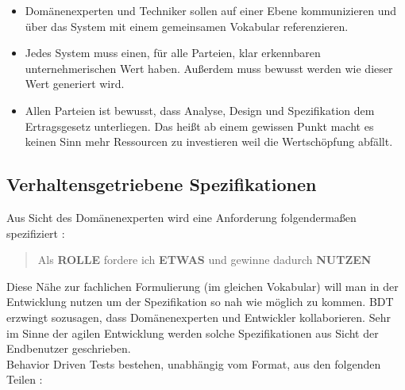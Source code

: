 \begin{itemize}
\item Domänenexperten und Techniker sollen auf einer Ebene kommunizieren und über das System mit einem gemeinsamen Vokabular referenzieren.
\item Jedes System muss einen, für alle Parteien, klar erkennbaren unternehmerischen Wert haben. Außerdem muss bewusst werden wie dieser Wert generiert wird.
\item Allen Parteien ist bewusst, dass Analyse, Design und Spezifikation dem Ertragsgesetz unterliegen. Das heißt ab einem gewissen Punkt macht es keinen Sinn mehr Ressourcen zu investieren weil die Wertschöpfung abfällt.
\end{itemize}

\subsection{Verhaltensgetriebene Spezifikationen}
Aus Sicht des Domänenexperten wird eine Anforderung folgendermaßen spezifiziert \cite{north_official_2015}: 

\begin{quote}Als \textbf{ROLLE} fordere ich \textbf{ETWAS} und gewinne dadurch \textbf{NUTZEN}\end{quote}

Diese Nähe zur fachlichen Formulierung (im gleichen Vokabular) will man in der Entwicklung nutzen um der Spezifikation so nah wie möglich zu kommen. \Gls{BDT} erzwingt sozusagen, dass Domänenexperten und Entwickler kollaborieren. Sehr im Sinne der agilen Entwicklung werden solche Spezifikationen aus Sicht der Endbenutzer geschrieben.\\
Behavior Driven Tests bestehen, unabhängig vom Format, aus den folgenden Teilen \cite{haring_bdd_2003}:

